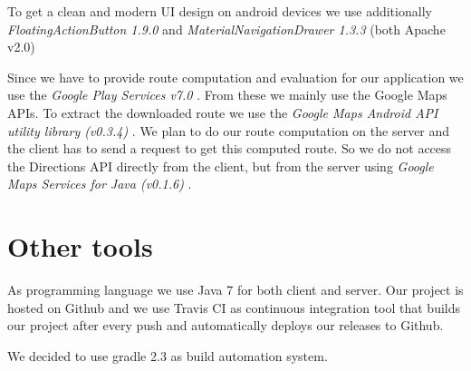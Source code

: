 \documentclass[ngerman, 10pt, a4paper]{scrartcl}
\begin{document}
To get a clean and modern UI design on android devices we use additionally \emph{FloatingActionButton 1.9.0} \cite{AFAB} and \emph{MaterialNavigationDrawer 1.3.3} \cite{MND} (both Apache v2.0)

Since we have to provide route computation and evaluation for our application we use the \emph{Google Play Services v7.0} \cite{PlayServices}. From these we mainly use the Google Maps APIs. To extract the downloaded route we use the \emph{Google Maps Android API utility library (v0.3.4)} \cite{MapsUtility}. We plan to do our route computation on the server and the client has to send a request to get this computed route. So we do not access the Directions API directly from the client, but from the server using \emph{Google Maps Services for Java (v0.1.6)} \cite{MapsJava}.

\section{Other tools}
As programming language we use Java 7 for both client and server. Our project is hosted on Github \cite{github} and we use Travis CI \cite{Travis} as continuous integration tool that builds our project after every push and automatically deploys our releases to Github.

We decided to use gradle 2.3 \cite{gradle} as build automation system.\\

{\footnotesize
\begin{multicols}{2}
\renewcommand{\section}[2]{}%


\end{multicols}
}
\end{document}
